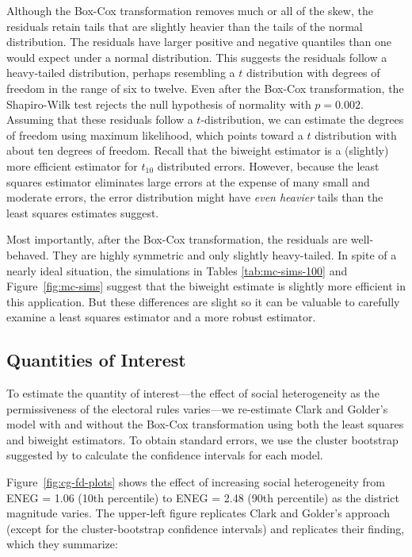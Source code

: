 \documentclass[12pt]{article}
\begin{document}
Although the Box-Cox transformation removes much or all of the skew, the residuals retain tails that are slightly heavier than the tails of the normal distribution. 
The residuals have larger positive and negative quantiles than one would expect under a normal distribution. 
This suggests the residuals follow a heavy-tailed distribution, perhaps resembling a $t$ distribution with degrees of freedom in the range of six to twelve. 
Even after the Box-Cox transformation, the Shapiro-Wilk test rejects the null hypothesis of normality with $p = 0.002$. 
Assuming that these residuals follow a $t$-distribution, we can estimate the degrees of freedom using maximum likelihood, which points toward a $t$ distribution with about ten degrees of freedom. 
Recall that the biweight estimator is a (slightly) more efficient estimator for $t_{10}$ distributed errors. 
However, because the least squares estimator eliminates large errors at the expense of many small and moderate errors, the error distribution might have \textit{even heavier} tails than the least squares estimates suggest.

Most importantly, after the Box-Cox transformation, the residuals are well-behaved. 
They are highly symmetric and only slightly heavy-tailed. 
In spite of a nearly ideal situation, the simulations in Tables \ref{tab:mc-sims-100} and Figure~\ref{fig:mc-sims} suggest that the biweight estimate is slightly more efficient in this application. 
But these differences are slight so it can be valuable to carefully examine a least squares estimator and a more robust estimator.

\subsection*{Quantities of Interest}

To estimate the quantity of interest---the effect of social heterogeneity as the permissiveness of the electoral rules varies---we re-estimate Clark and Golder's model with and without the Box-Cox transformation using both the least squares and biweight estimators. 
To obtain standard errors, we use the cluster bootstrap suggested by \cite{Harden2012} to calculate the confidence intervals for each model.

Figure~\ref{fig:cg-fd-plots} shows the effect of increasing social heterogeneity from ENEG = 1.06 (10th percentile) to ENEG = 2.48 (90th percentile) as the district magnitude varies. 
The upper-left figure replicates Clark and Golder's approach (except for the cluster-bootstrap confidence intervals) and replicates their finding, which they summarize:
\end{document}
